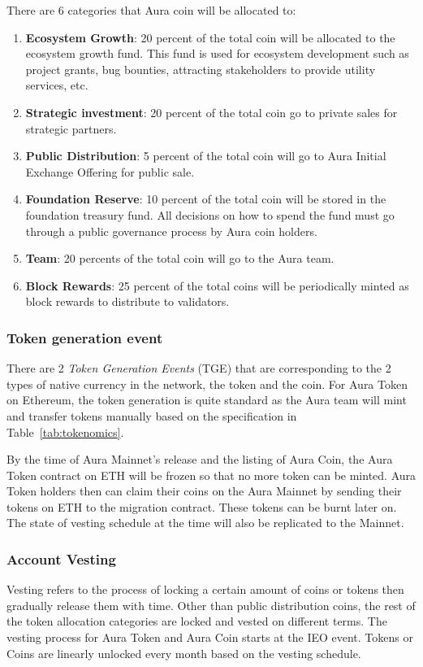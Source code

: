 \documentclass[12pt]{article}
\begin{document}
There are 6 categories that Aura coin will be allocated to:
\begin{enumerate}
    \item \textbf{Ecosystem Growth}: 20 percent of the total coin will be allocated to the ecosystem growth fund. This fund is used for ecosystem development such as project grants, bug bounties, attracting stakeholders to provide utility services, etc. 
    \item \textbf{Strategic investment}: 20 percent of the total coin go to private sales for strategic partners.
    \item \textbf{Public Distribution}: 5 percent of the total coin will go to Aura Initial Exchange Offering for public sale.
    \item \textbf{Foundation Reserve}: 10 percent of the total coin will be stored in the foundation treasury fund. All decisions on how to spend the fund must go through a public governance process by Aura coin holders. 
    \item \textbf{Team}: 20 percents of the total coin will go to the Aura team.
    \item \textbf{Block Rewards}: 25 percent of the total coins will be periodically minted as block rewards to distribute to validators.
\end{enumerate}

\subsubsection{Token generation event}
There are 2 \emph{Token Generation Events} (TGE) that are corresponding to the 2 types of native currency in the network, the token and the coin. For Aura Token on Ethereum, the token generation is quite standard as the Aura team will mint and transfer tokens manually based on the specification in Table~\ref{tab:tokenomics}.

By the time of Aura Mainnet's release and the listing of Aura Coin, the Aura Token contract on ETH will be frozen so that no more token can be minted. Aura Token holders then can claim their coins on the Aura Mainnet by sending their tokens on ETH to the migration contract. These tokens can be burnt later on. The state of vesting schedule at the time will also be replicated to the Mainnet. 

\subsubsection{Account Vesting}
Vesting refers to the process of locking a certain amount of coins or tokens then gradually release them with time. Other than public distribution coins, the rest of the token allocation categories are locked and vested on different terms. The vesting process for Aura Token and Aura Coin starts at the IEO event. Tokens or Coins are linearly unlocked every month based on the vesting schedule. 
\end{document}
